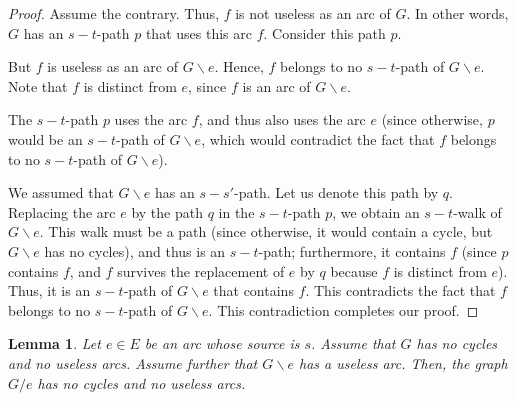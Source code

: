 \documentclass[12pt]{amsart}
\newtheorem{lemma}[theorem]{Lemma}
\theoremstyle{definition}
\begin{document}
\begin{proof}
Assume the contrary. Thus, $f$ is not useless as an arc of $G$.
In other words, $G$ has an $s-t$-path $p$ that uses this arc $f$.
Consider this path $p$.

But $f$ is useless as an arc of $G \backslash e$.
Hence, $f$ belongs to no $s-t$-path of $G \backslash e$.
Note that $f$ is distinct from $e$, since $f$ is an arc of
$G \backslash e$.

The $s-t$-path $p$ uses the arc $f$, and thus also uses the
arc $e$ (since otherwise, $p$ would be an
$s-t$-path of $G \backslash e$, which would contradict the fact
that $f$ belongs to no $s-t$-path of $G \backslash e$).

We assumed that $G \backslash e$ has an $s-s'$-path.
Let us denote this path by $q$.
Replacing the arc $e$ by the path $q$ in the $s-t$-path $p$,
we obtain an $s-t$-walk of $G \backslash e$.
This walk must be a path (since otherwise, it would contain a cycle,
but $G \backslash e$ has no cycles), and thus is an $s-t$-path;
furthermore, it contains $f$ (since $p$ contains $f$,
and $f$ survives the replacement of $e$ by $q$ because $f$ is
distinct from $e$).
Thus, it is an $s-t$-path of $G \backslash e$ that contains $f$.
This contradicts the fact that
$f$ belongs to no $s-t$-path of $G \backslash e$.
This contradiction completes our proof.
\end{proof}

\begin{lemma} \label{lem.G/e.C}
    Let $e \in E$ be an arc whose source is $s$.
    Assume that $G$ has no cycles and no useless arcs.
    Assume further that $G \backslash e$ has a useless arc.
    Then, the graph $G / e$ has no cycles and no useless arcs.
\end{lemma}
\end{document}
